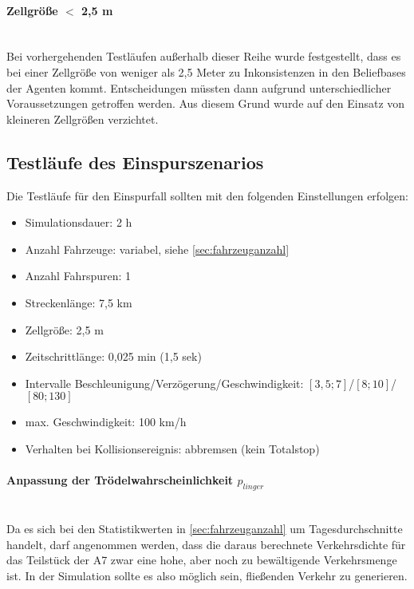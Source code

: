 \paragraph*{\texorpdfstring{Zellgröße $ < $ 2,5 m}%
                              {Zellgröße kleiner als 2,5 m}}
\hfill \\
Bei vorhergehenden Testläufen außerhalb dieser Reihe wurde festgestellt, dass es bei einer Zellgröße von weniger als 2,5 Meter zu Inkonsistenzen in den Beliefbases der Agenten kommt.
Entscheidungen müssten dann aufgrund unterschiedlicher Voraussetzungen getroffen werden.
Aus diesem Grund wurde auf den Einsatz von kleineren Zellgrößen verzichtet.






\subsection{Testläufe des Einspurszenarios}
\label{sec:test-singlelane}

Die Testläufe für den Einspurfall sollten mit den folgenden Einstellungen erfolgen:
\begin{itemize}
	\itemsep0em
	\item Simulationsdauer: 2 h
	\item Anzahl Fahrzeuge: variabel, siehe \cref{sec:fahrzeuganzahl}
	\item Anzahl Fahrspuren: 1
	\item Streckenlänge: 7,5 km 
	\item Zellgröße: 2,5 m
	\item Zeitschrittlänge: 0,025 min (1,5 sek)
	\item Intervalle Beschleunigung/Verzögerung/Geschwindigkeit: $ [3,5; 7] $/$ [8; 10] $/$ [80; 130] $
	\item max. Geschwindigkeit: 100 km/h
	\item Verhalten bei Kollisionsereignis: abbremsen (kein Totalstop)
\end{itemize}


\paragraph*{Anpassung der Trödelwahrscheinlichkeit $p_{linger}$}
\label{sec:adjust-linger}
\hfill \\
Da es sich bei den Statistikwerten in \cref{sec:fahrzeuganzahl} um Tagesdurchschnitte handelt, darf angenommen werden, dass die daraus berechnete Verkehrsdichte für das Teilstück der A7 zwar eine hohe, aber noch zu bewältigende Verkehrsmenge ist.
In der Simulation sollte es also möglich sein, fließenden Verkehr zu generieren.

